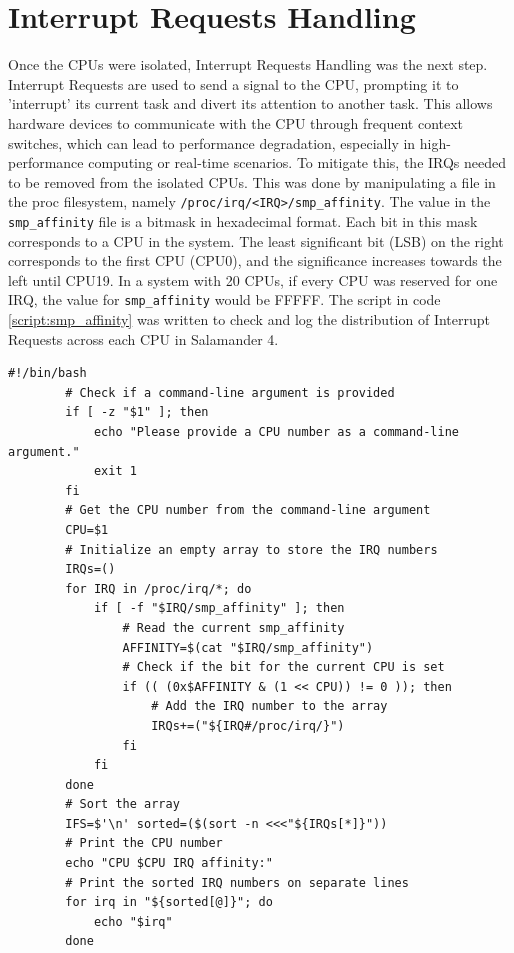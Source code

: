\documentclass[MMR,Master,english]{twbook}
\begin{document}
\section{Interrupt Requests Handling}\label{sec:irq_handling}
Once the CPUs were isolated, Interrupt Requests Handling was the next step. Interrupt Requests are used to send a signal to the CPU, prompting it to 'interrupt' its current task and divert its attention to another task. This allows hardware devices to communicate with the CPU through frequent context switches, which can lead to performance degradation, especially in high-performance computing or real-time scenarios. To mitigate this, the IRQs needed to be removed from the isolated CPUs. This was done by manipulating a file in the proc filesystem, namely \texttt{/proc/irq/<IRQ>/smp\_affinity}. The value in the \texttt{smp\_affinity} file is a bitmask in hexadecimal format. Each bit in this mask corresponds to a CPU in the system. The least significant bit (LSB) on the right corresponds to the first CPU (CPU0), and the significance increases towards the left until CPU19. In a system with 20 CPUs, if every CPU was reserved for one IRQ, the value for \texttt{smp\_affinity} would be FFFFF. The script in code \ref{script:smp_affinity} was written to check and log the distribution of Interrupt Requests across each CPU in Salamander 4.

\vspace{1em}
\begin{minipage}{0.95\columnwidth}
	\begin{lstlisting}[name={Check distribution of Interrupt Requests across each CPU},label={script:smp_affinity}]
		#!/bin/bash
		# Check if a command-line argument is provided
		if [ -z "$1" ]; then
			echo "Please provide a CPU number as a command-line argument."
			exit 1
		fi
		# Get the CPU number from the command-line argument
		CPU=$1
		# Initialize an empty array to store the IRQ numbers
		IRQs=()
		for IRQ in /proc/irq/*; do
			if [ -f "$IRQ/smp_affinity" ]; then
				# Read the current smp_affinity
				AFFINITY=$(cat "$IRQ/smp_affinity")
				# Check if the bit for the current CPU is set
				if (( (0x$AFFINITY & (1 << CPU)) != 0 )); then
					# Add the IRQ number to the array
					IRQs+=("${IRQ#/proc/irq/}")
				fi
			fi
		done
		# Sort the array
		IFS=$'\n' sorted=($(sort -n <<<"${IRQs[*]}"))
		# Print the CPU number
		echo "CPU $CPU IRQ affinity:"
		# Print the sorted IRQ numbers on separate lines
		for irq in "${sorted[@]}"; do
			echo "$irq"
		done
		
\end{lstlisting}
\end{minipage}
\end{document}
